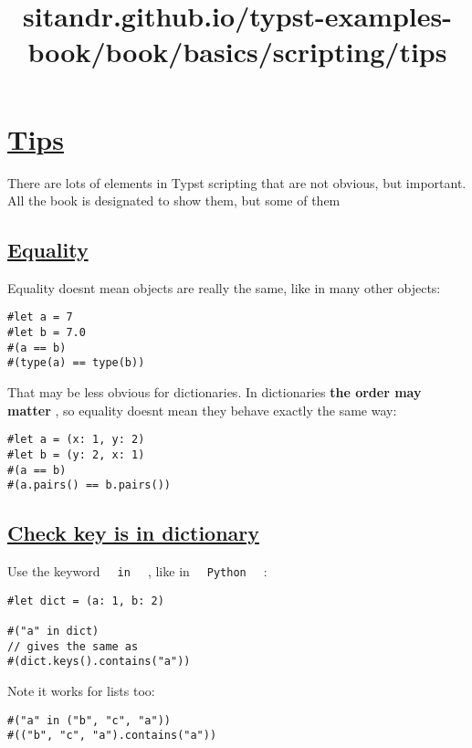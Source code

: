 \title{sitandr.github.io/typst-examples-book/book/basics/scripting/tips}

\section{\texorpdfstring{\hyperref[tips]{Tips}}{Tips}}\label{tips}

There are lots of elements in Typst scripting that are not obvious, but
important. All the book is designated to show them, but some of them

\subsection{\texorpdfstring{\hyperref[equality]{Equality}}{Equality}}\label{equality}

Equality doesn\textquotesingle t mean objects are really the same, like
in many other objects:

\begin{verbatim}
#let a = 7
#let b = 7.0
#(a == b)
#(type(a) == type(b))
\end{verbatim}

\pandocbounded{}

That may be less obvious for dictionaries. In dictionaries \textbf{the
order may matter} , so equality doesn\textquotesingle t mean they behave
exactly the same way:

\begin{verbatim}
#let a = (x: 1, y: 2)
#let b = (y: 2, x: 1)
#(a == b)
#(a.pairs() == b.pairs())
\end{verbatim}

\pandocbounded{}

\subsection{\texorpdfstring{\hyperref[check-key-is-in-dictionary]{Check
key is in
dictionary}}{Check key is in dictionary}}\label{check-key-is-in-dictionary}

Use the keyword \texttt{\ }{\texttt{\ in\ }}\texttt{\ } , like in
\texttt{\ }{\texttt{\ Python\ }}\texttt{\ } :

\begin{verbatim}
#let dict = (a: 1, b: 2)

#("a" in dict)
// gives the same as
#(dict.keys().contains("a"))
\end{verbatim}

\pandocbounded{}

Note it works for lists too:

\begin{verbatim}
#("a" in ("b", "c", "a"))
#(("b", "c", "a").contains("a"))
\end{verbatim}

\pandocbounded{}
